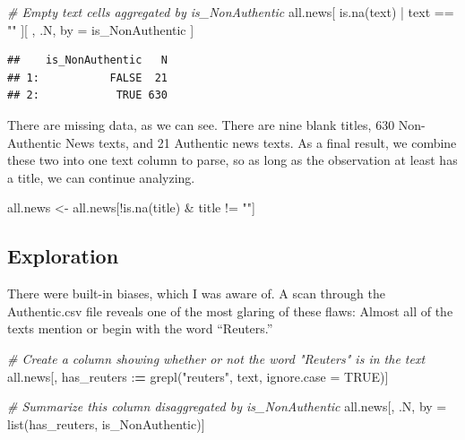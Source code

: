 \documentclass[
]{article}
\newenvironment{Shaded}{\begin{snugshade}}{\end{snugshade}}
\newcommand{\AttributeTok}[1]{\textcolor[rgb]{0.77,0.63,0.00}{#1}}
\newcommand{\CommentTok}[1]{\textcolor[rgb]{0.56,0.35,0.01}{\textit{#1}}}
\newcommand{\ConstantTok}[1]{\textcolor[rgb]{0.00,0.00,0.00}{#1}}
\newcommand{\ErrorTok}[1]{\textcolor[rgb]{0.64,0.00,0.00}{\textbf{#1}}}
\newcommand{\FunctionTok}[1]{\textcolor[rgb]{0.00,0.00,0.00}{#1}}
\newcommand{\NormalTok}[1]{#1}
\newcommand{\OtherTok}[1]{\textcolor[rgb]{0.56,0.35,0.01}{#1}}
\newcommand{\SpecialCharTok}[1]{\textcolor[rgb]{0.00,0.00,0.00}{#1}}
\newcommand{\StringTok}[1]{\textcolor[rgb]{0.31,0.60,0.02}{#1}}
\begin{document}
\begin{Shaded}
\begin{Highlighting}[]
\CommentTok{\# Empty text cells aggregated by is\_NonAuthentic}
\NormalTok{all.news[}
  \FunctionTok{is.na}\NormalTok{(text) }\SpecialCharTok{|}\NormalTok{ text }\SpecialCharTok{==} \StringTok{""}
\NormalTok{][}
\NormalTok{  ,}
\NormalTok{  .N,}
\NormalTok{  by }\OtherTok{=}\NormalTok{ is\_NonAuthentic}
\NormalTok{]}
\end{Highlighting}
\end{Shaded}

\begin{verbatim}
##    is_NonAuthentic   N
## 1:           FALSE  21
## 2:            TRUE 630
\end{verbatim}

There are missing data, as we can see. There are nine blank titles, 630
Non-Authentic News texts, and 21 Authentic news texts. As a final
result, we combine these two into one text column to parse, so as long
as the observation at least has a title, we can continue analyzing.

\begin{Shaded}
\begin{Highlighting}[]
\NormalTok{all.news }\OtherTok{\textless{}{-}}\NormalTok{ all.news[}\SpecialCharTok{!}\FunctionTok{is.na}\NormalTok{(title) }\SpecialCharTok{\&}\NormalTok{ title }\SpecialCharTok{!=} \StringTok{""}\NormalTok{]}
\end{Highlighting}
\end{Shaded}

\hypertarget{exploration}{%
\subsection{Exploration}\label{exploration}}

There were built-in biases, which I was aware of. A scan through the
Authentic.csv file reveals one of the most glaring of these flaws:
Almost all of the texts mention or begin with the word ``Reuters.''

\begin{Shaded}
\begin{Highlighting}[]
\CommentTok{\# Create a column showing whether or not the word "Reuters" is in the text}
\NormalTok{all.news[, has\_reuters }\SpecialCharTok{:}\ErrorTok{=} \FunctionTok{grepl}\NormalTok{(}\StringTok{"reuters"}\NormalTok{, text, }\AttributeTok{ignore.case =} \ConstantTok{TRUE}\NormalTok{)]}

\CommentTok{\# Summarize this column disaggregated by is\_NonAuthentic}
\NormalTok{all.news[, .N, by }\OtherTok{=} \FunctionTok{list}\NormalTok{(has\_reuters, is\_NonAuthentic)]}
\end{Highlighting}
\end{Shaded}
\end{document}

